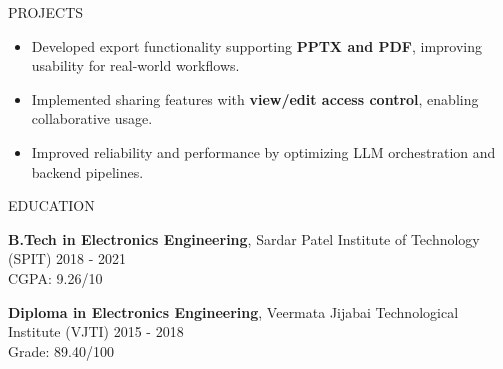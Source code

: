 \documentclass{resume}
\begin{document}
\begin{rSection}{PROJECTS}
\begin{itemize}
    \item Developed export functionality supporting \textbf{PPTX and PDF}, improving usability for real-world workflows.
    
    \item Implemented sharing features with \textbf{view/edit access control}, enabling collaborative usage.
    
    \item Improved reliability and performance by optimizing LLM orchestration and backend pipelines.

\end{itemize}

\end{rSection}




\begin{rSection}{EDUCATION}

{\bf B.Tech in Electronics Engineering}, Sardar Patel Institute of Technology (SPIT) \hfill {2018 - 2021}\\
CGPA: 9.26/10

{\bf Diploma in Electronics Engineering}, Veermata Jijabai Technological Institute (VJTI) \hfill {2015 - 2018}\\
Grade: 89.40/100

\end{rSection}
\end{document}
